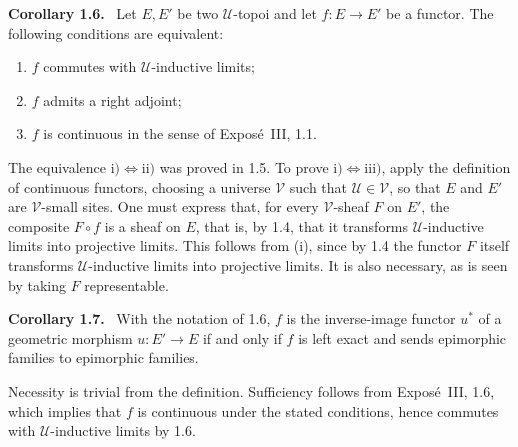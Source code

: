 \documentclass[11pt]{article}
\newcommand{\U}{\mathcal{U}}
\newcommand{\V}{\mathcal{V}}
\newenvironment{statement}[1]{\par\medskip\noindent\textbf{#1.}\ }{\par\medskip}
\begin{document}
\begin{statement}{Corollary 1.6}
Let \(E,E'\) be two \(\U\)-topoi and let \(f:E\to E'\) be a functor. The following conditions are equivalent:
\begin{enumerate}[label=\roman*)]
\item \(f\) commutes with \(\U\)-inductive limits;
\item \(f\) admits a right adjoint;
\item \(f\) is continuous in the sense of Expos\'e~III, 1.1.
\end{enumerate}
\end{statement}

The equivalence \(\mathrm{i)}\Leftrightarrow\mathrm{ii)}\) was proved in 1.5. To prove \(\mathrm{i)}\Leftrightarrow\mathrm{iii)}\), apply the definition of continuous functors, choosing a universe \(\V\) such that \(\U\in\V\), so that \(E\) and \(E'\) are \(\V\)-small sites. One must express that, for every \(\V\)-sheaf \(F\) on \(E'\), the composite \(F\circ f\) is a sheaf on \(E\), that is, by 1.4, that it transforms \(\U\)-inductive limits into projective limits. This follows from (i), since by 1.4 the functor \(F\) itself transforms \(\U\)-inductive limits into projective limits. It is also necessary, as is seen by taking \(F\) representable.

\begin{statement}{Corollary 1.7}
With the notation of 1.6, \(f\) is the inverse-image functor \(u^\ast\) of a geometric morphism \(u:E'\to E\) if and only if \(f\) is left exact and sends epimorphic families to epimorphic families.
\end{statement}

Necessity is trivial from the definition. Sufficiency follows from Expos\'e~III, 1.6, which implies that \(f\) is continuous under the stated conditions, hence commutes with \(\U\)-inductive limits by 1.6.
\end{document}
